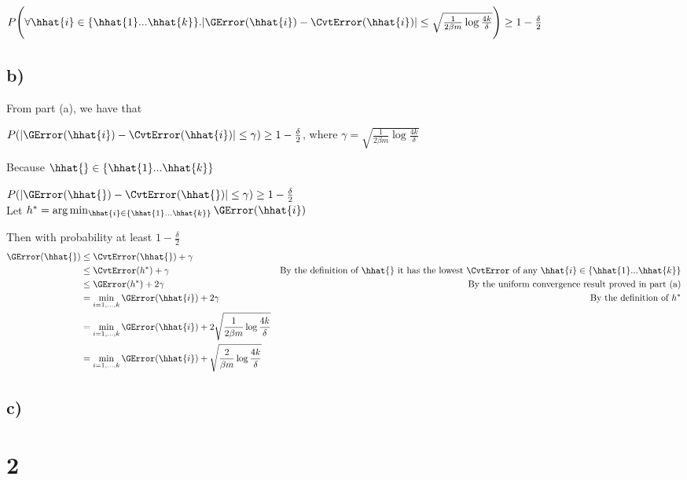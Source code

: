 \documentclass[11pt]{article}
\begin{document}
$P\Bigg(\forall \hhat{i} \in \{\hhat{1}...\hhat{k}\}. |\GError(\hhat{i}) - \CvtError(\hhat{i})| \le \sqrt{\frac{1}{2 \beta m} \log \frac{4k}{\delta}}\Bigg) \geq 1 - \frac{\delta}{2}$

\subsection*{b)}

From part (a), we have that 

$P(|\GError(\hhat{i}) - \CvtError(\hhat{i})| \le \gamma) \geq 1 - \frac{\delta}{2}$, where $\gamma = \sqrt{\frac{1}{2 \beta m} \log \frac{4k}{\delta}}$

Because $\hhat{} \in \{\hhat{1}...\hhat{k}\}$

$P(|\GError(\hhat{}) - \CvtError(\hhat{})| \le \gamma) \geq 1 - \frac{\delta}{2}$ \\

Let $h^* = \arg \min_{\hhat{i} \in \{\hhat{1}...\hhat{k}\}} \GError(\hhat{i})$

Then with probability at least $1 - \frac{\delta}{2}$ \begin{align*}
    \GError(\hhat{}) &\le \CvtError(\hhat{}) + \gamma \\
                     &\le \CvtError(h^*) + \gamma & \text{By the definition of $\hhat{}$ it has the lowest $\CvtError$ of any $\hhat{i} \in \{\hhat{1}...\hhat{k}\}$} \\
                     &\le \GError(h^*) + 2 \gamma & \text{By the uniform convergence result proved in part (a)} \\
                     &= \min_{i=1,...,k} \GError(\hhat{i}) + 2 \gamma & \text{By the definition of $h^*$} \\
                     &= \min_{i=1,...,k} \GError(\hhat{i}) + 2 \sqrt{\frac{1}{2 \beta m} \log \frac{4k}{\delta}} \\
                     &= \min_{i=1,...,k} \GError(\hhat{i}) + \sqrt{\frac{2}{\beta m} \log \frac{4k}{\delta}} \\
\end{align*}

\subsection*{c)}

\section*{2}
\end{document}
